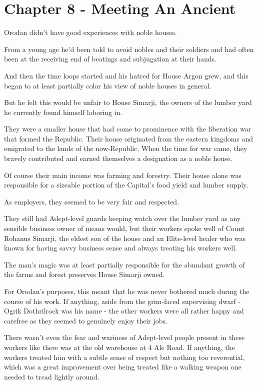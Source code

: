 \documentclass[a4paper,10pt]{book}
\begin{document}
\section*{Chapter 8 - Meeting An Ancient}
%
\par
Orodan didn’t have good experiences with noble houses.\par
From a young age he’d been told to avoid nobles and their soldiers and had often been at the receiving end of beatings and subjugation at their hands.\par
And then the time loops started and his hatred for House Argon grew, and this began to at least partially color his view of noble houses in general.\par
But he felt this would be unfair to House Simarji, the owners of the lumber yard he currently found himself laboring in.\par
They were a smaller house that had come to prominence with the liberation war that formed the Republic. Their house originated from the eastern kingdoms and emigrated to the lands of the now-Republic. When the time for war came, they bravely contributed and earned themselves a designation as a noble house.\par
Of course their main income was farming and forestry. Their house alone was responsible for a sizeable portion of the Capital’s food yield and lumber supply.\par
As employers, they seemed to be very fair and respected.\par
They still had Adept-level guards keeping watch over the lumber yard as any sensible business owner of means would, but their workers spoke well of Count Rohanus Simarji, the eldest son of the house and an Elite-level healer who was known for having savvy business sense and always treating his workers well.\par
The man’s magic was at least partially responsible for the abundant growth of the farms and forest preserves House Simarji owned.\par
For Orodan’s purposes, this meant that he was never bothered much during the course of his work. If anything, aside from the grim-faced supervising dwarf - Ogrik Dothrilrock was his name - the other workers were all rather happy and carefree as they seemed to genuinely enjoy their jobs.\par
There wasn’t even the fear and wariness of Adept-level people present in these workers like there was at the old warehouse at 4 Ale Road. If anything, the workers treated him with a subtle sense of respect but nothing too reverential, which was a great improvement over being treated like a walking weapon one needed to tread lightly around.\par
\end{document}
